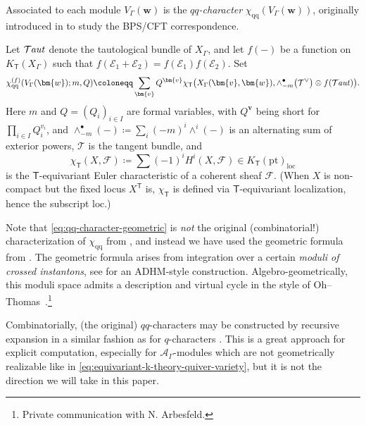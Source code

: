 \documentclass[10pt,a4paper]{amsart}
\numberwithin{equation}{section}
\renewcommand{\vec}[1]{\bm{#1}}
\newcommand{\cE}{\mathcal{E}}
\newcommand{\cF}{\mathcal{F}}
\newcommand{\cT}{\mathcal{T}}
\newcommand{\kQ}{Q}
\newcommand{\sT}{\mathsf{T}}
\newcommand{\scA}{\mathscr{A}}
\newcommand{\pt}{\mathrm{pt}}
\newcommand{\loc}{\mathrm{loc}}
\newcommand{\chiqq}{\chi_{\mathrm{qq}}}
\DeclareMathOperator{\Taut}{\mathcal{T}\mkern-1.5mu{\mathit{aut}}}
\begin{document}
\begin{MyParagraph}
Associated to each module $V_\Gamma(\vec w)$ is the {\it $qq$-character}
$\chiqq(V_\Gamma(\vec w))$, originally introduced in \cite{Nekrasov2016} to
study the BPS/CFT correspondence.

\begin{Definition}
 Let $\Taut$ denote the tautological bundle of $X_\Gamma$, and let $f(-)$
 be a function on $K_\sT(X_\Gamma)$ such that $f(\cE_1 + \cE_2) = f(\cE_1)
 f(\cE_2)$. Set
 \begin{equation} \label{eq:qq-character-geometric}
 \chiqq^{(f)} (V_\Gamma(\vec w); m, \kQ ) \coloneqq \sum_{\vec v} \kQ^{\vec v} \chi_\sT\big(X_\Gamma(\vec v, \vec w), \wedge_{-m}^\bullet \big(\cT^\vee \big) \otimes f(\Taut)\big).
 \end{equation}
 Here $m$ and $\kQ = (\kQ_i)_{i \in I}$ are formal variables, with
 $\kQ^{\vec v}$ being short for $\prod_{i \in I} \kQ_i^{v_i}$, and
 $\wedge_{-m}^\bullet(-) \coloneqq \sum_i (-m)^i \wedge^i(-)$ is an
 alternating sum of exterior powers, $\cT$ is the tangent bundle, and
 \[ \chi_\sT(X, \cF) \coloneqq \sum (-1)^i H^i(X, \cF) \in K_\sT(\pt)_{\loc} \]
 is the $\sT$-equivariant Euler characteristic of a coherent sheaf
 $\cF$. (When $X$ is non-compact but the fixed locus $X^{\sT}$ is,
 $\chi_\sT$ is defined via $\sT$-equivariant localization, hence the
 subscript $\loc$.)
\end{Definition}
\end{MyParagraph}

\begin{MyParagraph}
Note that \eqref{eq:qq-character-geometric} is {\it not} the original
(combinatorial!) characterization of $\chiqq$ from \cite[Section~6.1]{Nekrasov2016}, and instead we have used the geometric formula
from \cite[Sections~8.3 and 8.4]{Nekrasov2016}. The geometric formula arises
from integration over a certain {\it moduli of crossed instantons},
see \cite{Nekrasov2017} for an ADHM-style construction.
Algebro-geometrically, this moduli space admits a description and
virtual cycle in the style of Oh--Thomas~\cite{Oh2020}.\footnote{Private communication with N. Arbesfeld.}

Combinatorially, (the original) $qq$-characters may be constructed by
recursive expansion \cite{Feigin2021} in a similar fashion as for
$q$-characters \cite{Frenkel2001}. This is a great approach for
explicit computation, especially for $\scA_\Gamma$-modules which are not
geometrically realizable like in
\eqref{eq:equivariant-k-theory-quiver-variety}, but it is not the
direction we will take in this paper.
\end{MyParagraph}
\end{document}
